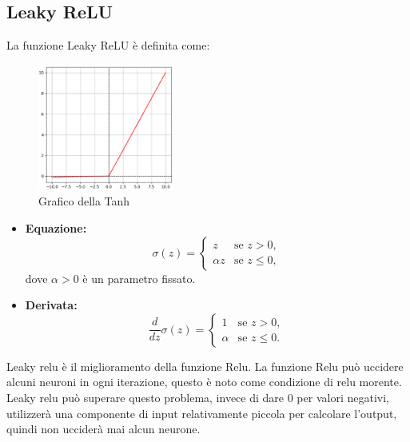 \subsection{Leaky ReLU}
La funzione Leaky ReLU è definita come:

\begin{multicols}{2}
    {
        \begin{figure}[H]
            \centering
            \includegraphics[width=0.40\textwidth]{Immagini/Grafici/graficoLeakyRelu.png}
            \caption{Grafico della Tanh}
        \end{figure}
    }
    {
        \begin{itemize}
            \item \textbf{Equazione:}
            \begin{equation}
                \sigma(z) = \begin{cases}
                    z & \text{se } z > 0, \\
                    \alpha z & \text{se } z \leq 0,
                \end{cases}
            \end{equation}
            dove \(\alpha > 0\) è un parametro fissato.
            \item \textbf{Derivata:}
            \begin{equation}
                \frac{d}{dz}\sigma(z) = \begin{cases}
                    1 & \text{se } z > 0, \\
                    \alpha & \text{se } z \leq 0.
                \end{cases}
            \end{equation}
        \end{itemize}
    }
\end{multicols}


Leaky relu è il miglioramento della funzione Relu. La funzione Relu può uccidere 
alcuni neuroni in ogni iterazione, questo è noto come condizione di relu morente. 
Leaky relu può superare questo problema, invece di dare 0 per valori negativi, 
utilizzerà una componente di input relativamente piccola per calcolare l’output, 
quindi non ucciderà mai alcun neurone.





